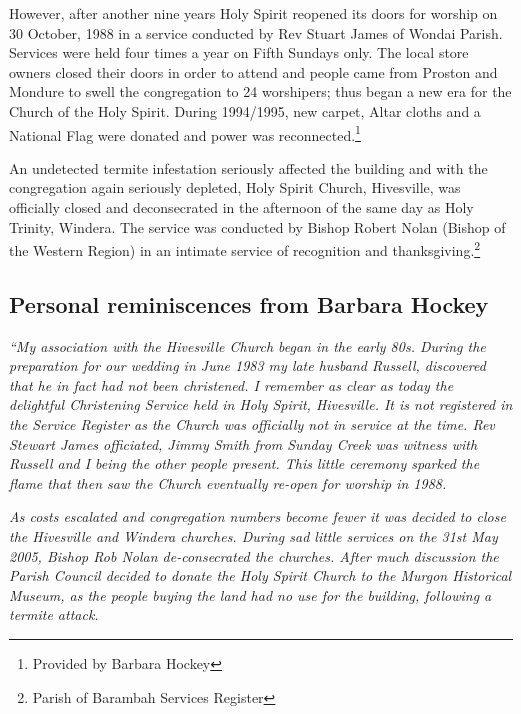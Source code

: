 However, after another nine years Holy Spirit reopened its doors for worship on 30 October, 1988 in a service conducted by Rev Stuart James of Wondai Parish. Services were held four times a year on Fifth Sundays only. The local store owners closed their doors in order to attend and people came from Proston and Mondure to swell the congregation to 24 worshipers; thus began a new era for the Church of the Holy Spirit. During 1994/1995, new carpet, Altar cloths and a National Flag were donated and power was reconnected.\footnote{Provided by Barbara Hockey}


An undetected termite infestation seriously affected the building and with the congregation again seriously depleted, Holy Spirit Church, Hivesville, was officially closed and deconsecrated in the afternoon of the same day as Holy Trinity, Windera. The service was conducted by Bishop Robert Nolan (Bishop of the Western Region) in an intimate service of recognition and thanksgiving.\footnote{Parish of Barambah Services Register}


\subsection{Personal reminiscences from Barbara Hockey}



\emph{``My association with the Hivesville Church began in the early 80s. During the preparation for our wedding in June 1983 my late husband Russell, discovered that he in fact had not been christened. I remember as clear as today the delightful Christening Service held in Holy Spirit, Hivesville. It is not registered in the Service Register as the Church was officially not in service at the time. Rev Stewart James officiated, Jimmy Smith from Sunday Creek was witness with Russell and I being the other people present. This little ceremony sparked the flame that then saw the Church eventually re-open for worship in 1988.}



\emph{As costs escalated and congregation numbers become fewer it was decided to close the Hivesville and Windera churches. During sad little services on the 31st May 2005, Bishop Rob Nolan de-consecrated the churches. After much discussion the Parish Council decided to donate the Holy Spirit Church to the Murgon Historical Museum, as the people buying the land had no use for the building, following a termite attack.}




